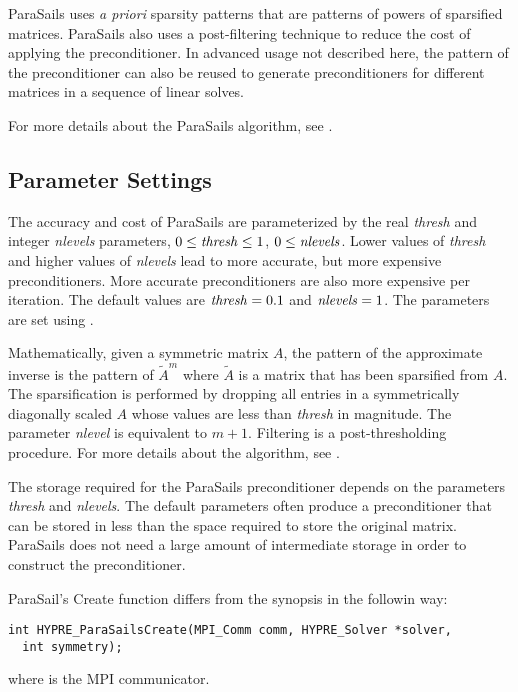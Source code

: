 ParaSails uses {\em a priori} sparsity patterns that are patterns of powers
of sparsified matrices.  ParaSails also uses a post-filtering technique
to reduce the cost of applying the preconditioner.  
In advanced usage not described here, the pattern of the
preconditioner can also be reused to generate preconditioners for different
matrices in a sequence of linear solves.

For more details about the ParaSails algorithm, see \cite{EChow_2000}.


\subsection{Parameter Settings}

The accuracy and cost of ParaSails are parameterized by the real {\em thresh}
and integer {\em nlevels} parameters,
$0 \le {\it thresh} \le 1$, $0 \le {\it nlevels}$.
Lower values of {\em thresh}
and higher values of {\em nlevels} lead to more accurate, but more expensive
preconditioners.  More accurate preconditioners are also more expensive
per iteration.  The default values are ${\it thresh} = 0.1$
and ${\it nlevels} = 1$.  The parameters are set using
.

Mathematically, given a symmetric matrix $A$, the pattern of the
approximate inverse is the pattern of $\tilde{A}^m$ where $\tilde{A}$
is a matrix that has been sparsified from $A$.  The sparsification
is performed by dropping all entries in a symmetrically diagonally scaled $A$
whose values are less than {\em thresh} in magnitude.  The parameter
{\em nlevel} is equivalent to $m+1$.
Filtering is a post-thresholding procedure.
For more details about the algorithm, see \cite{EChow_2000}.

The storage required for the ParaSails preconditioner depends on
the parameters {\em thresh} and {\em nlevels}.  The default parameters
often produce a preconditioner that can be stored in less than the
space required to store the original matrix.
ParaSails does not need a large amount of intermediate storage in
order to construct the preconditioner.


ParaSail's Create function differs from the synopsis in the followin way:

\begin{display}
\begin{verbatim}
int HYPRE_ParaSailsCreate(MPI_Comm comm, HYPRE_Solver *solver,
  int symmetry);
\end{verbatim}
\end{display}
where  is the MPI communicator.

